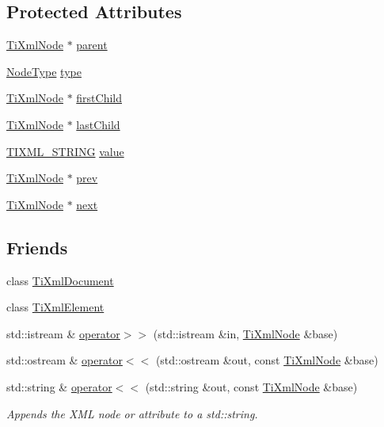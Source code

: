 \subsection*{Protected Attributes}
\begin{DoxyCompactItemize}
\item 
\hyperlink{class_ti_xml_node}{Ti\-Xml\-Node} $\ast$ \hyperlink{class_ti_xml_node_a662c4de61244e4fa5bd4e2d8c63143a5}{parent}
\item 
\hyperlink{class_ti_xml_node_a836eded4920ab9e9ef28496f48cd95a2}{Node\-Type} \hyperlink{class_ti_xml_node_a2619c6379181c16ba95ae6922e2ca839}{type}
\item 
\hyperlink{class_ti_xml_node}{Ti\-Xml\-Node} $\ast$ \hyperlink{class_ti_xml_node_af749fb7f22010b80e8f904c32653d50e}{first\-Child}
\item 
\hyperlink{class_ti_xml_node}{Ti\-Xml\-Node} $\ast$ \hyperlink{class_ti_xml_node_a5b30756d21b304580d22a841ec9d61f8}{last\-Child}
\item 
\hyperlink{tinyxml_8h_a92bada05fd84d9a0c9a5bbe53de26887}{T\-I\-X\-M\-L\-\_\-\-S\-T\-R\-I\-N\-G} \hyperlink{class_ti_xml_node_aead528b3cedc33c16a6c539872c7cc8b}{value}
\item 
\hyperlink{class_ti_xml_node}{Ti\-Xml\-Node} $\ast$ \hyperlink{class_ti_xml_node_a9c5370ea2cbfd9f0e0f7b30a57fd68f5}{prev}
\item 
\hyperlink{class_ti_xml_node}{Ti\-Xml\-Node} $\ast$ \hyperlink{class_ti_xml_node_a2f329cc993d2d34df76e17dcbb776b45}{next}
\end{DoxyCompactItemize}
\subsection*{Friends}
\begin{DoxyCompactItemize}
\item 
class \hyperlink{class_ti_xml_node_a173617f6dfe902cf484ce5552b950475}{Ti\-Xml\-Document}
\item 
class \hyperlink{class_ti_xml_node_ab6592e32cb9132be517cc12a70564c4b}{Ti\-Xml\-Element}
\item 
std\-::istream \& \hyperlink{class_ti_xml_node_ab57bd426563c926844f65a78412e18b9}{operator$>$$>$} (std\-::istream \&in, \hyperlink{class_ti_xml_node}{Ti\-Xml\-Node} \&base)
\item 
std\-::ostream \& \hyperlink{class_ti_xml_node_a86cd49cfb17a844c0010b3136ac966c7}{operator$<$$<$} (std\-::ostream \&out, const \hyperlink{class_ti_xml_node}{Ti\-Xml\-Node} \&base)
\item 
std\-::string \& \hyperlink{class_ti_xml_node_a52ef17e7080df2490cf87bde380685ab}{operator$<$$<$} (std\-::string \&out, const \hyperlink{class_ti_xml_node}{Ti\-Xml\-Node} \&base)
\begin{DoxyCompactList}\small\item\em Appends the X\-M\-L node or attribute to a std\-::string. \end{DoxyCompactList}\end{DoxyCompactItemize}
